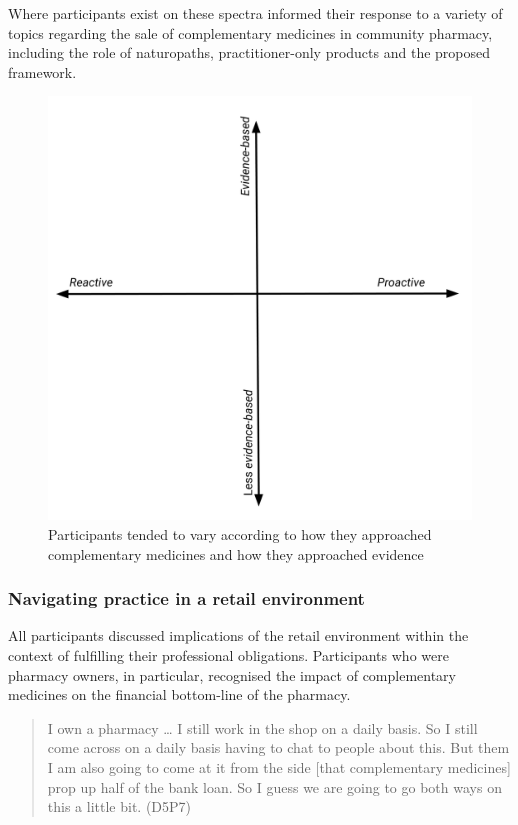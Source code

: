 \documentclass[11pt,a4paper]{article}
\begin{document}
Where participants exist on these spectra informed their response to a
variety of topics regarding the sale of complementary medicines in
community pharmacy, including the role of naturopaths, practitioner-only
products and the proposed framework.

\begin{figure}
\centering
\includegraphics{files/CMEthics_context3.png}
\caption{Participants tended to vary according to how they approached
complementary medicines and how they approached evidence
\label{context3}}
\end{figure}

\subsubsection{Navigating practice in a retail
environment}\label{navigating-practice-in-a-retail-environment}

All participants discussed implications of the retail environment within
the context of fulfilling their professional obligations. Participants
who were pharmacy owners, in particular, recognised the impact of
complementary medicines on the financial bottom-line of the pharmacy.

\begin{quote}
I own a pharmacy \ldots{} I still work in the shop on a daily basis. So
I still come across on a daily basis having to chat to people about
this. But them I am also going to come at it from the side {[}that
complementary medicines{]} prop up half of the bank loan. So I guess we
are going to go both ways on this a little bit. (D5P7)
\end{quote}
\end{document}
